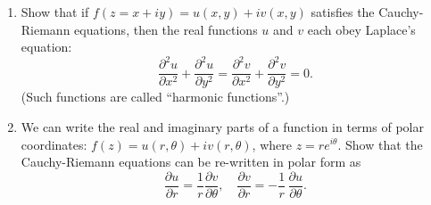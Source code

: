 \documentclass[10pt,a4paper]{article}
\begin{document}
\begin{enumerate}
\item
  Show that if $f(z = x + iy) = u(x,y) + i v(x,y)$ satisfies the
  Cauchy-Riemann equations, then the real functions $u$ and $v$ each
  obey Laplace's equation:
  \begin{equation}
    \frac{\partial^2 u}{\partial x^2} + \frac{\partial^2u}{\partial y^2} = \frac{\partial^2 v}{\partial x^2} + \frac{\partial^2 v}{\partial y^2} = 0.
  \end{equation}
  (Such functions are called ``harmonic functions''.)

\item
  We can write the real and imaginary parts of a function in terms of
  polar coordinates: $f(z) = u(r,\theta) + i v(r,\theta)$, where $z =
  re^{i\theta}$.  Show that the Cauchy-Riemann equations can be
  re-written in polar form as
  \begin{equation}
    \frac{\partial u}{\partial r} =  \frac{1}{r} \frac{\partial v}{\partial \theta}, \quad \frac{\partial v}{\partial r} =  - \frac{1}{r}\,  \frac{\partial u}{\partial \theta}.
  \end{equation}
\end{enumerate}
\end{document}
